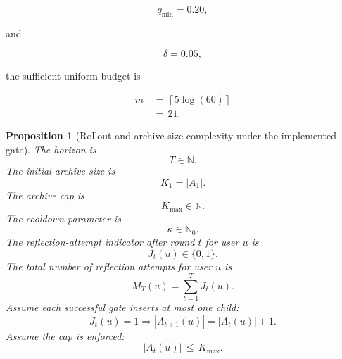 \documentclass{article} %
\newtheorem{proposition}[theorem]{Proposition}
\begin{document}
\begin{equation}
\label{eq:app-third-coverage-example-q}
q_{\min}
=
0.20,
\end{equation}

and

\begin{equation}
\label{eq:app-third-coverage-example-delta}
\delta
=
0.05,
\end{equation}

the sufficient uniform budget is

\begin{align}
\label{eq:app-third-coverage-example-m}
m
&\,=\,
\left\lceil
5\log(60)
\right\rceil
\\
&\,=\,
21.
\end{align}

\begin{proposition}[Rollout and archive-size complexity under the implemented gate]
\label{prop:3}
The horizon is
\begin{equation}
\label{eq:app-third-rollout-horizon}
T
\in
\mathbb{N}.
\end{equation}
The initial archive size is
\begin{equation}
\label{eq:app-third-rollout-k1}
K_1
=
|A_1|.
\end{equation}
The archive cap is
\begin{equation}
\label{eq:app-third-rollout-kmax}
K_{\max}
\in
\mathbb{N}.
\end{equation}
The cooldown parameter is
\begin{equation}
\label{eq:app-third-rollout-kappa}
\kappa
\in
\mathbb{N}_0.
\end{equation}
The reflection-attempt indicator after round \(t\) for user \(u\) is
\begin{equation}
\label{eq:app-third-rollout-indicator}
J_t(u)
\in
\{0,1\}.
\end{equation}
The total number of reflection attempts for user \(u\) is
\begin{equation}
\label{eq:app-third-rollout-count}
M_T(u)
=
\sum_{t=1}^{T}
J_t(u).
\end{equation}
Assume each successful gate inserts at most one child:
\begin{equation}
\label{eq:app-third-rollout-one-child}
J_t(u)=1
\Rightarrow
|A_{t+1}(u)|=|A_t(u)|+1.
\end{equation}
Assume the cap is enforced:
\begin{equation}
\label{eq:app-third-rollout-cap}
|A_t(u)|
\,\le\,
K_{\max}.
\end{equation}

\end{proposition}
\end{document}

